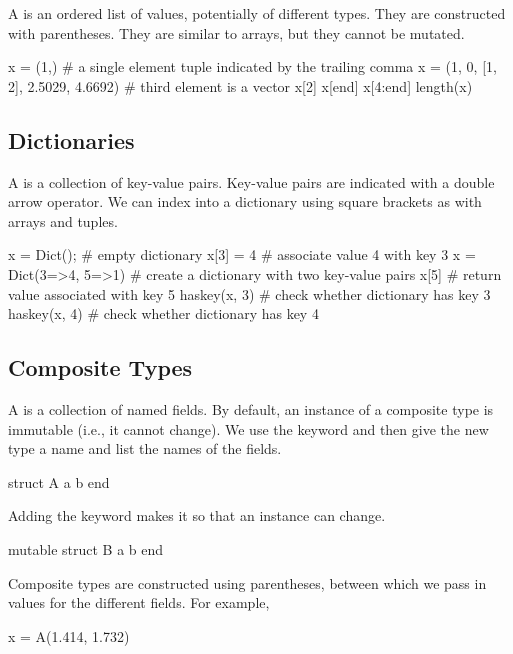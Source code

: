 A  is an ordered list of values, potentially of different types. They are constructed with parentheses. They are similar to arrays, but they cannot be mutated.
\begin{juliaconsole}
x = (1,) # a single element tuple indicated by the trailing comma
x = (1, 0, [1, 2],  2.5029, 4.6692) # third element is a vector
x[2]
x[end]
x[4:end]
length(x)
\end{juliaconsole}

\subsection{Dictionaries}
\label{sec:dictionaries}

A  is a collection of key-value pairs. Key-value pairs are indicated with a double arrow operator. We can index into a dictionary using square brackets as with arrays and tuples.
\begin{juliaconsole}
x = Dict(); # empty dictionary
x[3] = 4 # associate value 4 with key 3
x = Dict(3=>4, 5=>1) # create a dictionary with two key-value pairs
x[5]         # return value associated with key 5
haskey(x, 3) # check whether dictionary has key 3
haskey(x, 4) # check whether dictionary has key 4
\end{juliaconsole}

\subsection{Composite Types}

A  is a collection of named fields. By default, an instance of a composite type is immutable (i.e., it cannot change). We use the  keyword and then give the new type a name and list the names of the fields.
\begin{juliaverbatim}
struct A
    a
    b
end
\end{juliaverbatim}

Adding the keyword  makes it so that an instance can change.
\begin{juliaverbatim}
mutable struct B
    a
    b
end
\end{juliaverbatim}

Composite types are constructed using parentheses, between which we pass in values for the different fields. For example,
\begin{juliaverbatim}
x = A(1.414, 1.732)
\end{juliaverbatim}

